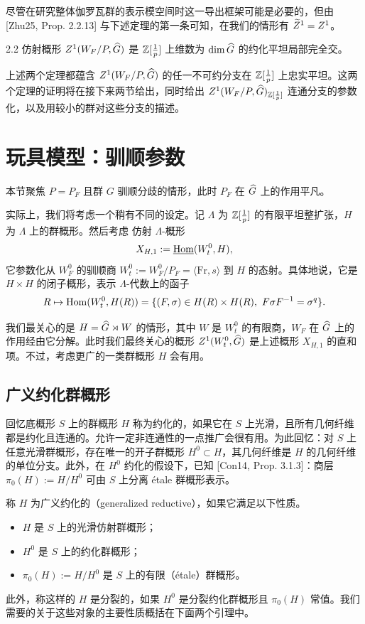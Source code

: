 尽管在研究整体伽罗瓦群的表示模空间时这一导出框架可能是必要的，但由 [Zhu25, Prop. 2.2.13] 与下述定理的第一条可知，在我们的情形有 $\widetilde Z^1=Z^1$。

\begin{thm}{2.2}
仿射概形 $Z^1(W_F/P,\widehat{G})$ 是 $\mathbb{Z}[\frac1p]$ 上维数为 $\dim\widehat{G}$ 的约化平坦局部完全交。
\end{thm}

上述两个定理都蕴含 $Z^1(W_F/P,\widehat{G})$ 的任一不可约分支在 $\mathbb{Z}[\frac1p]$ 上忠实平坦。这两个定理的证明将在接下来两节给出，同时给出 $Z^1(W_F/P,\widehat{G})_{\mathbb{Z}[\frac1p]}$ 连通分支的参数化，以及用较小的群对这些分支的描述。

\section{玩具模型：驯顺参数}

本节聚焦 $P=P_F$ 且群 $G$ 驯顺分歧的情形，此时 $P_F$ 在 $\widehat{G}$ 上的作用平凡。

实际上，我们将考虑一个稍有不同的设定。记 $\Lambda$ 为 $\mathbb{Z}[\frac1p]$ 的有限平坦整扩张，$H$ 为 $\Lambda$ 上的群概形。然后考虑
仿射 $\Lambda$-概形
\[
X_{H,1}:=\underline{\operatorname{Hom}}(W^0_t,H),
\]
它参数化从 $W^0_F$ 的驯顺商 $W^0_t:=W^0_F/P_F=\langle\mathrm{Fr},s\rangle$ 到 $H$ 的态射。具体地说，它是 $H\times H$ 的闭子概形，表示 $\Lambda$-代数上的函子
\[
R\mapsto\operatorname{Hom}(W^0_t,H(R))=\{(F,\sigma)\in H(R)\times H(R),\ F\sigma F^{-1}=\sigma^q\}.
\]

我们最关心的是 $H=\widehat{G}\rtimes W$ 的情形，其中 $W$ 是 $W^0_t$ 的有限商，$W_F$ 在 $\widehat{G}$ 上的作用经由它分解。此时我们最终关心的概形 $Z^1(W^0_t,\widehat{G})$ 是上述概形 $X_{H,1}$ 的直和项。不过，考虑更广的一类群概形 $H$ 会有用。

\subsection{广义约化群概形}

回忆底概形 $S$ 上的群概形 $H$ 称为约化的，如果它在 $S$ 上光滑，且所有几何纤维都是约化且连通的。允许一定非连通性的一点推广会很有用。为此回忆：对 $S$ 上任意光滑群概形，存在唯一的开子群概形 $H^0\subset H$，其几何纤维是 $H$ 的几何纤维的单位分支。此外，在 $H^0$ 约化的假设下，已知 [Con14, Prop. 3.1.3]：商层 $\pi_0(H):=H/H^0$ 可由 $S$ 上分离 étale 群概形表示。

称 $H$ 为广义约化的（generalized reductive），如果它满足以下性质。
\begin{itemize}[leftmargin=1.6em,itemsep=0.15em]
\item $H$ 是 $S$ 上的光滑仿射群概形；
\item $H^0$ 是 $S$ 上的约化群概形；
\item $\pi_0(H):=H/H^0$ 是 $S$ 上的有限（étale）群概形。
\end{itemize}
此外，称这样的 $H$ 是分裂的，如果 $H^0$ 是分裂约化群概形且 $\pi_0(H)$ 常值。我们需要的关于这些对象的主要性质概括在下面两个引理中。


